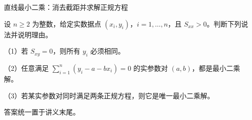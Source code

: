 \documentclass[aspectratio=169,10pt,fontset=fandol]{ctexbeamer}
\begin{document}
\begin{frame}[t,fragile]{直线最小二乘：消去截距并求解正规方程}
\normalsize
{\normalsize
\begin{exercise}
\label{mathagent:exercise:b4c9c9a1fb82bcef052fdbf6e1539831ed88cee016dbcbf83a50e5e8d2311be0}
设 $n\geq2$ 为整数，给定实数据点 $(x_i,y_i)$，$i=1,\ldots,n$，且 $S_{xx}>0$。判断下列说法并说明理由。

（1）若 $S_{xy}=0$，则所有 $y_i$ 必须相同。

（2）任意满足 $\sum_{i=1}^{n}(y_i-a-bx_i)=0$ 的实参数对 $(a,b)$，都是最小二乘解。

（3）若某实参数对同时满足两条正规方程，则它是唯一最小二乘解。

答案统一置于讲义末尾。
\end{exercise}
}
\end{frame}
\end{document}
